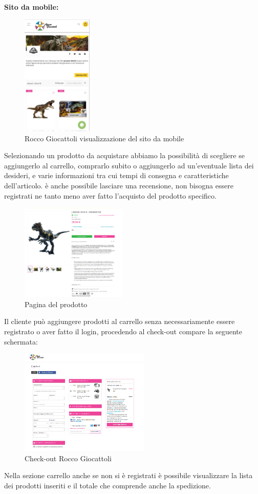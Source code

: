 \textbf{Sito da mobile:}
\begin{figure}[H]
        \centering
        \includegraphics[width=0.3\textwidth]{immagini/roccogiocattoli_mobile.jpg}
        \caption{Rocco Giocattoli visualizzazione del sito da mobile}
    \end{figure}
Selezionando un prodotto da acquistare abbiamo la possibilità di scegliere se aggiungerlo al carrello, comprarlo subito o aggiungerlo ad un'eventuale lista dei desideri, e varie informazioni tra cui tempi di consegna e caratteristiche dell'articolo. è anche possibile lasciare una recensione, non bisogna essere registrati ne tanto meno aver fatto l'acquisto del prodotto specifico. 
\begin{figure}[H]
        \centering
        \includegraphics[width=0.45\textwidth]{immagini/prodotto_roccogiocattoli.png}
        \caption{Pagina del prodotto }
    \end{figure}
Il cliente può aggiungere prodotti al carrello senza necessariamente essere registrato o aver fatto il login, procedendo al check-out compare la seguente schermata:
 \begin{figure}[H]
        \centering
        \includegraphics[width=0.55\textwidth]{immagini/check-out_roccogiocattoli.png}
        \caption{Check-out Rocco Giocattoli}
    \end{figure}
Nella sezione carrello anche se non si è registrati è possibile visualizzare la lista dei prodotti inseriti e il totale che comprende anche la spedizione.

